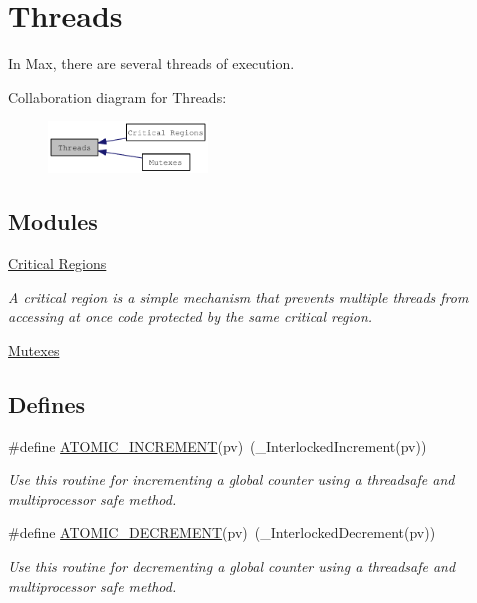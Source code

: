\hypertarget{group__threading}{
\section{Threads}
\label{group__threading}
}


In Max, there are several threads of execution.  


Collaboration diagram for Threads:\nopagebreak
\begin{figure}[H]
\begin{center}
\leavevmode
\includegraphics[width=120pt]{group__threading}
\end{center}
\end{figure}
\subsection*{Modules}
\begin{DoxyCompactItemize}
\item 
\hyperlink{group__critical}{Critical Regions}


\begin{DoxyCompactList}\small\item\em A critical region is a simple mechanism that prevents multiple threads from accessing at once code protected by the same critical region. \item\end{DoxyCompactList}\item 
\hyperlink{group__mutex}{Mutexes}
\end{DoxyCompactItemize}
\subsection*{Defines}
\begin{DoxyCompactItemize}
\item 
\#define \hyperlink{group__threading_ga411e2e07982bdfb1803b415a350e311a}{ATOMIC\_\-INCREMENT}(pv)~(\_\-InterlockedIncrement(pv))
\begin{DoxyCompactList}\small\item\em Use this routine for incrementing a global counter using a threadsafe and multiprocessor safe method. \item\end{DoxyCompactList}\item 
\#define \hyperlink{group__threading_gaa42a5aadef70fe57dc80d247c890c9ac}{ATOMIC\_\-DECREMENT}(pv)~(\_\-InterlockedDecrement(pv))
\begin{DoxyCompactList}\small\item\em Use this routine for decrementing a global counter using a threadsafe and multiprocessor safe method. \item\end{DoxyCompactList}\end{DoxyCompactItemize}
